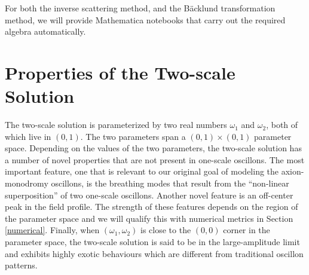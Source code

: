 \documentclass{report}
\begin{document}
\medbreak
For both the inverse scattering method, and the B\"acklund transformation method, we will provide Mathematica notebooks that carry out the required algebra automatically.

\chapter{Properties of the Two-scale Solution}
The two-scale solution is parameterized by two real numbers $\omega_1$ and $\omega_2$, both of which live in $(0,1)$. The two parameters span a $(0,1)\times(0,1)$ parameter space. Depending on the values of the two parameters, the two-scale solution has a number of novel properties that are not present in one-scale oscillons. The most important feature, one that is relevant to our original goal of modeling the axion-monodromy oscillons, is the breathing modes that result from the ``non-linear superposition'' of two one-scale oscillons. Another novel feature is an off-center peak in the field profile. The strength of these features depends on the region of the parameter space and we will qualify this with numerical metrics in Section \ref{numerical}. Finally, when $(\omega_1,\omega_2)$ is close to the $(0,0)$ corner in the parameter space, the two-scale solution is said to be in the large-amplitude limit and exhibits highly exotic behaviours which are different from traditional oscillon patterns.
\end{document}
